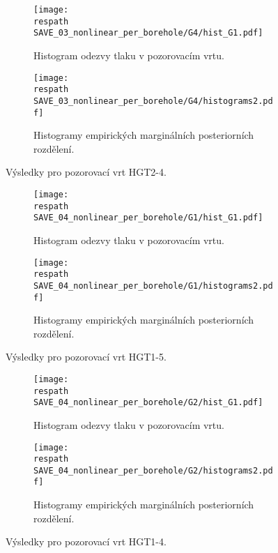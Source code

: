 \documentclass{article}
\newcommand{\respath}{results/}
\begin{document}
\begin{figure}[htb!]
    \centering
    \begin{subfigure}[t]{0.495\textwidth}
      \texttt{[image: \\respath SAVE\_03\_nonlinear\_per\_borehole/G4/hist\_G1.pdf]}
      \caption{Histogram odezvy tlaku v pozorovacím vrtu.}
      \label{fig:hist_g4_lin}
    \end{subfigure}
    \begin{subfigure}[t]{0.495\textwidth}
      \texttt{[image: \\respath SAVE\_03\_nonlinear\_per\_borehole/G4/histograms2.pdf]}
      \caption{Histogramy empirických marginálních posteriorních rozdělení.}
      \label{fig:hist_g4_lin_params}
    \end{subfigure}
    \caption{Výsledky pro pozorovací vrt HGT2-4.}
    \label{fig:hist_G4}
\end{figure}



\cleardoublepage

\begin{figure}[htb!]
    \centering
    \begin{subfigure}[t]{0.495\textwidth}
      \texttt{[image: \\respath SAVE\_04\_nonlinear\_per\_borehole/G1/hist\_G1.pdf]}
      \caption{Histogram odezvy tlaku v pozorovacím vrtu.}
      \label{fig:hist_g1_nonlin}
    \end{subfigure}
    \begin{subfigure}[t]{0.495\textwidth}
      \texttt{[image: \\respath SAVE\_04\_nonlinear\_per\_borehole/G1/histograms2.pdf]}
      \caption{Histogramy empirických marginálních posteriorních rozdělení.}
      \label{fig:hist_g1_lin_params}
    \end{subfigure}
    \caption{Výsledky pro pozorovací vrt HGT1-5.}
    \label{fig:hist_G1}
\end{figure}

\begin{figure}[htb!]
    \centering
    \begin{subfigure}[t]{0.495\textwidth}
      \texttt{[image: \\respath SAVE\_04\_nonlinear\_per\_borehole/G2/hist\_G1.pdf]}
      \caption{Histogram odezvy tlaku v pozorovacím vrtu.}
      \label{fig:hist_g2_lin}
    \end{subfigure}
    \begin{subfigure}[t]{0.495\textwidth}
      \texttt{[image: \\respath SAVE\_04\_nonlinear\_per\_borehole/G2/histograms2.pdf]}
      \caption{Histogramy empirických marginálních posteriorních rozdělení.}
      \label{fig:hist_g2_lin_params}
    \end{subfigure}
    \caption{Výsledky pro pozorovací vrt HGT1-4.}
    \label{fig:hist_G2}
\end{figure}
\end{document}
